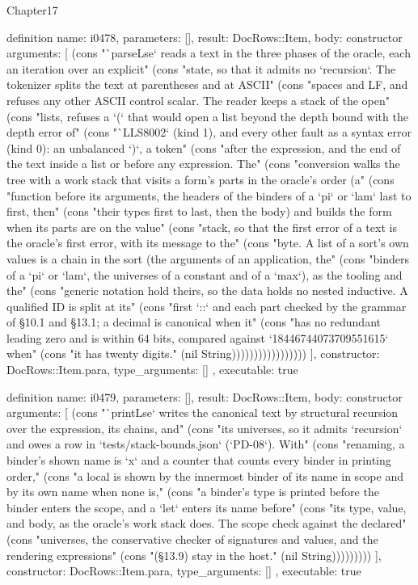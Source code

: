 \begin{lexlean}{Chapter17}
\begin{semanticmodule}
definition{
  name: i0478,
  parameters: [],
  result: DocRows::Item,
  body: constructor{
    arguments: [
      (cons "`parseLse` reads a text in the three phases of the oracle, each an iteration over an explicit" (cons "state, so that it admits no `recursion`. The tokenizer splits the text at parentheses and at ASCII" (cons "spaces and LF, and refuses any other ASCII control scalar. The reader keeps a stack of the open" (cons "lists, refuses a `(` that would open a list beyond the depth bound with the depth error of" (cons "`LLS8002` (kind 1), and every other fault as a syntax error (kind 0): an unbalanced `)`, a token" (cons "after the expression, and the end of the text inside a list or before any expression. The" (cons "conversion walks the tree with a work stack that visits a form's parts in the oracle's order (a" (cons "function before its arguments, the headers of the binders of a `pi` or `lam` last to first, then" (cons "their types first to last, then the body) and builds the form when its parts are on the value" (cons "stack, so that the first error of a text is the oracle's first error, with its message to the" (cons "byte. A list of a sort's own values is a chain in the sort (the arguments of an application, the" (cons "binders of a `pi` or `lam`, the universes of a constant and of a `max`), as the tooling and the" (cons "generic notation hold theirs, so the data holds no nested inductive. A qualified ID is split at its" (cons "first `::` and each part checked by the grammar of §10.1 and §13.1; a decimal is canonical when it" (cons "has no redundant leading zero and is within 64 bits, compared against `18446744073709551615` when" (cons "it has twenty digits." (nil String)))))))))))))))))
    ],
    constructor: DocRows::Item.para,
    type_arguments: []
  },
  executable: true
}

definition{
  name: i0479,
  parameters: [],
  result: DocRows::Item,
  body: constructor{
    arguments: [
      (cons "`printLse` writes the canonical text by structural recursion over the expression, its chains, and" (cons "its universes, so it admits `recursion` and owes a row in `tests/stack-bounds.json` (`PD-08`). With" (cons "renaming, a binder's shown name is `x` and a counter that counts every binder in printing order," (cons "a local is shown by the innermost binder of its name in scope and by its own name when none is," (cons "a binder's type is printed before the binder enters the scope, and a `let` enters its name before" (cons "its type, value, and body, as the oracle's work stack does. The scope check against the declared" (cons "universes, the conservative checker of signatures and values, and the rendering expressions" (cons "(§13.9) stay in the host." (nil String)))))))))
    ],
    constructor: DocRows::Item.para,
    type_arguments: []
  },
  executable: true
}


\end{semanticmodule}
\end{lexlean}
